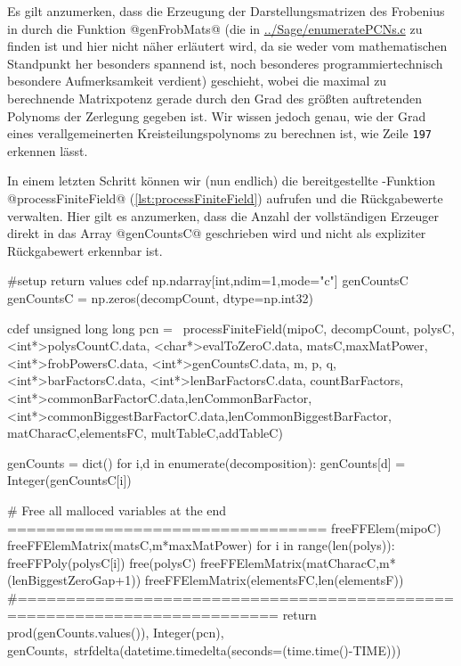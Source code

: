 Es gilt anzumerken, dass die Erzeugung der Darstellungsmatrizen des Frobenius
in \Clang durch die Funktion @genFrobMats@ 
(die in \url{../Sage/enumeratePCNs.c} zu finden ist und hier nicht näher
erläutert wird, da sie weder vom mathematischen Standpunkt her besonders
spannend ist, noch besonderes programmiertechnisch besondere Aufmerksamkeit
verdient)
geschieht, wobei die maximal zu berechnende
Matrixpotenz gerade durch den Grad des größten auftretenden Polynoms der
Zerlegung gegeben ist. Wir wissen jedoch genau, wie der Grad eines
verallgemeinerten Kreisteilungspolynoms zu berechnen ist, wie Zeile
\texttt{197} erkennen lässt.

In einem letzten Schritt können wir (nun endlich) die bereitgestellte
\Clang-Funktion @processFiniteField@ (\autoref{lst:processFiniteField}) 
aufrufen und die Rückgabewerte verwalten. Hier gilt es anzumerken, dass die
Anzahl der vollständigen Erzeuger direkt in das Array @genCountsC@ geschrieben
wird und nicht als expliziter Rückgabewert erkennbar ist.


\begin{sagecode}[caption={\texttt{countCompleteSubmoduleGenerators}
  Fortsetzung (IV)}, 
  firstnumber=241]
    #setup return values
    cdef np.ndarray[int,ndim=1,mode="c"] genCountsC
    genCountsC = np.zeros(decompCount, dtype=np.int32)

    cdef unsigned long long pcn = \
            processFiniteField(mipoC, decompCount,
                    polysC,<int*>polysCountC.data,
                    <char*>evalToZeroC.data,
                    matsC,maxMatPower,<int*>frobPowersC.data,
                    <int*>genCountsC.data, m, p, q,
                    <int*>barFactorsC.data, <int*>lenBarFactorsC.data,
                    countBarFactors,
                    <int*>commonBarFactorC.data,lenCommonBarFactor,
                    <int*>commonBiggestBarFactorC.data,lenCommonBiggestBarFactor,
                    matCharacC,elementsFC,
                    multTableC,addTableC)

    genCounts = dict()
    for i,d in enumerate(decomposition):
        genCounts[d] = Integer(genCountsC[i])

    # Free all malloced variables at the end =================================
    freeFFElem(mipoC)
    freeFFElemMatrix(matsC,m*maxMatPower)
    for i in range(len(polys)):
        freeFFPoly(polysC[i])
    free(polysC)
    freeFFElemMatrix(matCharacC,m*(lenBiggestZeroGap+1))
    freeFFElemMatrix(elementsFC,len(elementsF))
    #=========================================================================
    return prod(genCounts.values()), Integer(pcn), genCounts,\
            strfdelta(datetime.timedelta(seconds=(time.time()-TIME)))
\end{sagecode}


